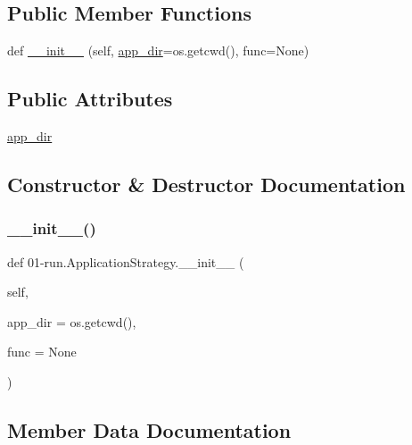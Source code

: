 \subsection*{Public Member Functions}
\begin{DoxyCompactItemize}
\item 
def \hyperlink{class01-run_1_1ApplicationStrategy_ad44af9dac41b60baba09a6b075f6ccb3}{\+\_\+\+\_\+init\+\_\+\+\_\+} (self, \hyperlink{class01-run_1_1ApplicationStrategy_a6da5fb87319ab82c9170ffe8acb85206}{app\+\_\+dir}=os.\+getcwd(), func=None)
\end{DoxyCompactItemize}
\subsection*{Public Attributes}
\begin{DoxyCompactItemize}
\item 
\hyperlink{class01-run_1_1ApplicationStrategy_a6da5fb87319ab82c9170ffe8acb85206}{app\+\_\+dir}
\end{DoxyCompactItemize}


\subsection{Constructor \& Destructor Documentation}
\mbox{\label{class01-run_1_1ApplicationStrategy_ad44af9dac41b60baba09a6b075f6ccb3}} 
\subsubsection{\texorpdfstring{\+\_\+\+\_\+init\+\_\+\+\_\+()}{\_\_init\_\_()}}
{\footnotesize\ttfamily def 01-\/run.\+Application\+Strategy.\+\_\+\+\_\+init\+\_\+\+\_\+ (\begin{DoxyParamCaption}\item[{}]{self,  }\item[{}]{app\+\_\+dir = {\ttfamily os.getcwd()},  }\item[{}]{func = {\ttfamily None} }\end{DoxyParamCaption})}



\subsection{Member Data Documentation}
\mbox{\label{class01-run_1_1ApplicationStrategy_a6da5fb87319ab82c9170ffe8acb85206}} 
